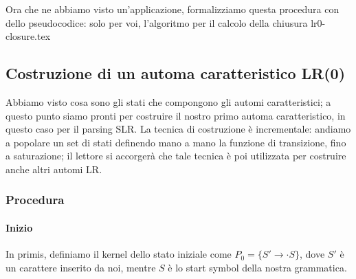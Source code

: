 \documentclass[class=book, crop=false, oneside, 12pt]{standalone}
\begin{document}
Ora che ne abbiamo visto un'applicazione, formalizziamo questa procedura con dello pseudocodice: solo per voi, l'algoritmo per il calcolo della chiusura
{lr0-closure.tex}

\subsection{Costruzione di un automa caratteristico LR(0)}
Abbiamo visto cosa sono gli stati che compongono gli automi caratteristici; a questo punto siamo pronti per costruire il nostro primo automa caratteristico, in questo caso per il parsing SLR. La tecnica di costruzione è incrementale: andiamo a popolare un set di stati definendo mano a mano la funzione di transizione, fino a saturazione; il lettore si accorgerà che tale tecnica è poi utilizzata per costruire anche altri automi LR.

\subsubsection{Procedura}
\paragraph{Inizio}
In primis, definiamo il kernel dello stato iniziale come \(P_0 = \{S' \to \cdot S\}\), dove \(S'\) è un carattere inserito da noi, mentre \(S\) è lo start symbol della nostra grammatica.
\end{document}
